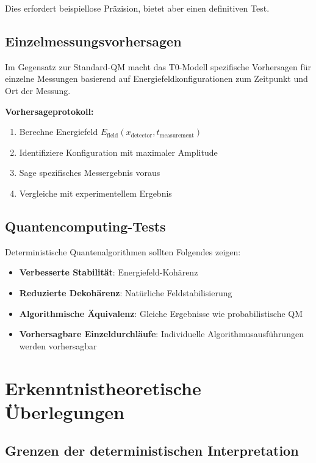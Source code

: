 \documentclass[12pt,a4paper]{report}
\begin{document}
	Dies erfordert beispiellose Präzision, bietet aber einen definitiven Test.
	
	\subsection{Einzelmessungsvorhersagen}
	\label{subsec:single_measurement_predictions}
	
	Im Gegensatz zur Standard-QM macht das T0-Modell spezifische Vorhersagen für einzelne Messungen basierend auf Energiefeldkonfigurationen zum Zeitpunkt und Ort der Messung.
	
	\textbf{Vorhersageprotokoll:}
	\begin{enumerate}
		\item Berechne Energiefeld $E_{\text{field}}(x_{\text{detector}}, t_{\text{measurement}})$
		\item Identifiziere Konfiguration mit maximaler Amplitude
		\item Sage spezifisches Messergebnis voraus
		\item Vergleiche mit experimentellem Ergebnis
	\end{enumerate}
	
	\subsection{Quantencomputing-Tests}
	\label{subsec:quantum_computing_tests}
	
	Deterministische Quantenalgorithmen sollten Folgendes zeigen:
	\begin{itemize}
		\item \textbf{Verbesserte Stabilität}: Energiefeld-Kohärenz
		\item \textbf{Reduzierte Dekohärenz}: Natürliche Feldstabilisierung
		\item \textbf{Algorithmische Äquivalenz}: Gleiche Ergebnisse wie probabilistische QM
		\item \textbf{Vorhersagbare Einzeldurchläufe}: Individuelle Algorithmusausführungen werden vorhersagbar
	\end{itemize}
	
	\section{Erkenntnistheoretische Überlegungen}
	\label{sec:epistemological}
	
	\subsection{Grenzen der deterministischen Interpretation}
	\label{subsec:limits_deterministic}
	
\end{document}

